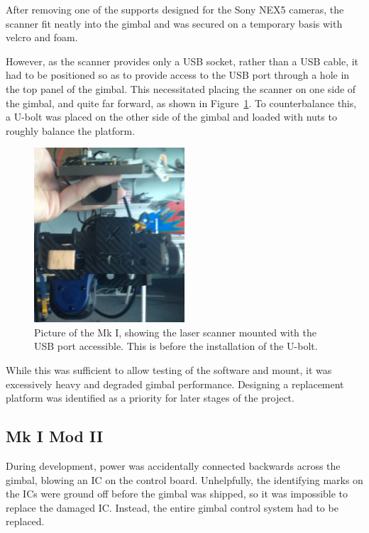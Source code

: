 \documentclass[12pt,oneside,a4paper]{book}
\begin{document}
After removing one of the supports designed for the Sony NEX5 cameras,
the scanner fit neatly into the gimbal and was secured on a temporary
basis with velcro and foam.

However, as the scanner provides only a USB socket, rather than a USB
cable, it had to be positioned so as to provide access to the USB port
through a hole in the top panel of the gimbal. This necessitated
placing the scanner on one side of the gimbal, and quite far forward,
as shown in Figure~\ref{fig:mk1-mount}. To counterbalance this, a
U-bolt was placed on the other side of the gimbal and loaded with nuts
to roughly balance the platform.

\begin{figure}[h!]
  \centering
  \includegraphics[width=0.5\textwidth]{figs/mk1-mount}
  \caption{Picture of the Mk I, showing the laser scanner mounted with the USB port accessible. This is before the installation of the U-bolt.}
  \label{fig:mk1-mount}
\end{figure}

While this was sufficient to allow testing of the software and mount,
it was excessively heavy and degraded gimbal performance. Designing a
replacement platform was identified as a priority for later stages of the project.

\subsection{Mk I Mod II}
\label{sec:mk-ib}

During development, power was accidentally connected backwards across
the gimbal, blowing an IC on the control board. Unhelpfully, the
identifying marks on the ICs were ground off before the gimbal was
shipped, so it was impossible to replace the damaged IC. Instead, the
entire gimbal control system had to be replaced.
\end{document}

